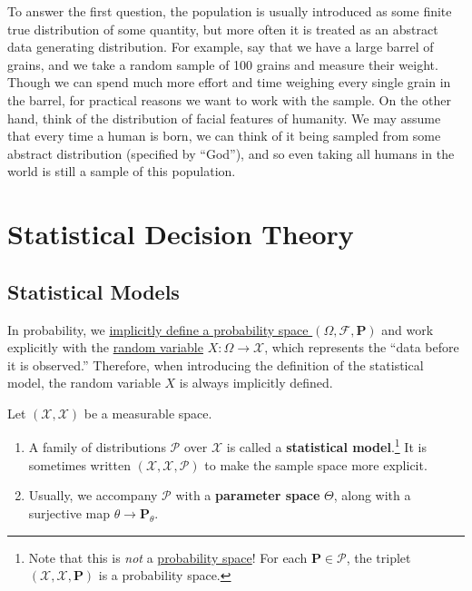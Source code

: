   To answer the first question, the population is usually introduced as some finite true distribution of some quantity, but more often it is treated as an abstract data generating distribution. For example, say that we have a large barrel of grains, and we take a random sample of 100 grains and measure their weight. Though we can spend much more effort and time weighing every single grain in the barrel, for practical reasons we want to work with the sample. On the other hand, think of the distribution of facial features of humanity. We may assume that every time a human is born, we can think of it being sampled from some abstract distribution (specified by ``God''), and so even taking all humans in the world is still a sample of this population. 

\section{Statistical Decision Theory} 

\subsection{Statistical Models} 

  In probability, we \hyperref[prob-thm:pushforward]{implicitly define a probability space $(\Omega, \mathcal{F}, \mathbf{P})$} and work explicitly with the \hyperref[prob-def:random-variable]{random variable} $X: \Omega \to \mathcal{X}$, which represents the ``data before it is observed.'' Therefore, when introducing the definition of the statistical model, the random variable $X$ is always implicitly defined.  
  
  \begin{definition}
    \label{def:statistical-model}
    Let $(\mathcal{X}, \mathscr{X})$ be a measurable space. 
    \begin{enumerate}
      \item A family of distributions $\mathcal{P}$ over $\mathcal{X}$ is called a \textbf{statistical model}.\footnote{Note that this is \textit{not} a \hyperref[prob-def:probability-space]{probability space}! For each $\mathbf{P} \in \mathcal{P}$, the triplet $(\mathcal{X}, \mathscr{X}, \mathbf{P})$ is a probability space.} It is sometimes written $(\mathcal{X}, \mathscr{X}, \mathcal{P})$ to make the sample space more explicit. 
      \item Usually, we accompany $\mathcal{P}$ with a \textbf{parameter space} $\Theta$, along with a surjective map $\theta \to \mathbf{P}_{\theta}$. 
    \end{enumerate}
  \end{definition} 

